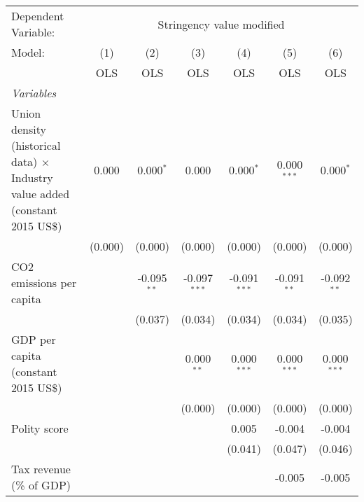 
\begingroup
\centering
\begin{tabular}{lcccccc}
   \toprule
   Dependent Variable: & \multicolumn{6}{c}{Stringency value modified}\\
   Model:                                                                               & (1)     & (2)           & (3)            & (4)            & (5)           & (6)\\  
                                                                                        &  OLS    & OLS           & OLS            & OLS            & OLS           & OLS\\  
   \midrule
   \emph{Variables}\\
   Union density (historical data) $\times$ Industry value added (constant 2015 US\$)   & 0.000   & 0.000$^{*}$   & 0.000          & 0.000$^{*}$    & 0.000$^{***}$ & 0.000$^{*}$\\   
                                                                                        & (0.000) & (0.000)       & (0.000)        & (0.000)        & (0.000)       & (0.000)\\   
   CO2 emissions per capita                                                             &         & -0.095$^{**}$ & -0.097$^{***}$ & -0.091$^{***}$ & -0.091$^{**}$ & -0.092$^{**}$\\   
                                                                                        &         & (0.037)       & (0.034)        & (0.034)        & (0.034)       & (0.035)\\   
   GDP per capita (constant 2015 US\$)                                                  &         &               & 0.000$^{**}$   & 0.000$^{***}$  & 0.000$^{***}$ & 0.000$^{***}$\\   
                                                                                        &         &               & (0.000)        & (0.000)        & (0.000)       & (0.000)\\   
   Polity score                                                                         &         &               &                & 0.005          & -0.004        & -0.004\\   
                                                                                        &         &               &                & (0.041)        & (0.047)       & (0.046)\\   
   Tax revenue (\% of GDP)                                                              &         &               &                &                & -0.005        & -0.005\\   

\end{tabular}

